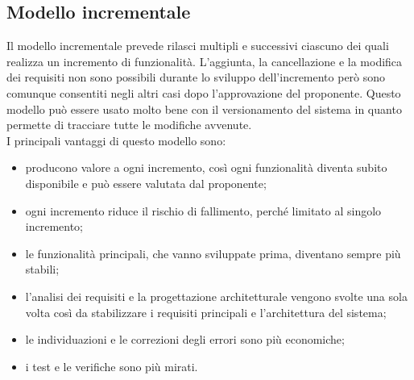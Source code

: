\subsection{Modello incrementale}
Il modello incrementale prevede rilasci multipli e successivi ciascuno dei quali realizza un incremento di funzionalità.
L'aggiunta, la cancellazione e la modifica dei requisiti non sono possibili durante lo sviluppo dell'incremento però sono comunque consentiti negli altri casi dopo l'approvazione del proponente.
Questo modello può essere usato molto bene con il versionamento del sistema in quanto permette di tracciare tutte le modifiche avvenute.\\
I principali vantaggi di questo modello sono:
\begin{itemize}
	\item producono valore a ogni incremento, così ogni funzionalità diventa subito disponibile e può essere valutata dal proponente;\\
	\item ogni incremento riduce il rischio di fallimento, perché limitato al singolo incremento;\\
	\item le funzionalità principali, che vanno sviluppate prima, diventano sempre più stabili;\\
	\item l'analisi dei requisiti e la progettazione architetturale vengono svolte una sola volta così da stabilizzare i requisiti principali e l'architettura del sistema;\\
	\item le individuazioni e le correzioni degli errori sono più economiche; \\
	\item i test e le verifiche sono più mirati. \\
\end{itemize}

